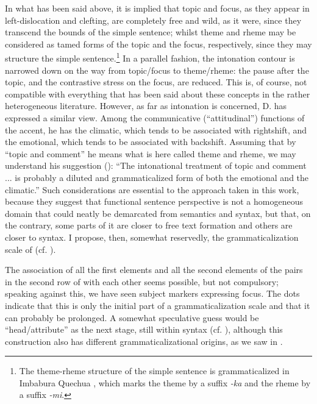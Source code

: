 In what has been said above, it is implied that topic and focus, as they appear in left-dislocation and clefting, are completely free and wild, as it were, since they transcend the bounds of the simple sentence; whilst theme and rheme may be considered as tamed forms of the topic and the focus, respectively, since they may structure the simple sentence.\footnote{The theme-rheme structure of the simple sentence is grammaticalized in Imbabura Quechua \citep[95-98]{Cole1982}, which marks the theme by a suffix \textit{{}-ka} and the rheme by a suffix \textit{{}-mi}.} In a parallel fashion, the intonation contour is narrowed down on the way from topic/focus to theme/rheme: the pause after the topic, and the contrastive stress on the focus, are reduced. This is, of course, not compatible with everything that has been said about these concepts in the rather heterogeneous literature. However, as far as intonation is concerned, D. \citet{Bolinger1978} has expressed a similar view. Among the communicative (“attitudinal”) functions of the accent, he has the climatic, which tends to be associated with rightshift, and the emotional, which tends to be associated with backshift. Assuming that by ``topic and comment'' he means what is here called theme and rheme, we may understand his suggestion (\citeyear[489]{Bolinger1978}): “The intonational treatment of topic and comment ... is probably a diluted and grammaticalized form of both the emotional and the climatic.” Such considerations are essential to the approach taken in this work, because they suggest that functional sentence perspective is not a homogeneous domain that could neatly be demarcated from semantics and syntax, but that, on the contrary, some parts of it are closer to free text formation and others are closer to syntax. I propose, then, somewhat reservedly, the grammaticalization scale of  (cf. ).

The association of all the first elements and all the second elements of the pairs in the second row of  with each other seems possible, but not compulsory; speaking against this, we have seen subject markers expressing focus. The dots indicate that this is only the initial part of a grammaticalization scale and that it can probably be prolonged. A somewhat speculative guess would be ``head/attribute'' as the next stage, still within syntax (cf. \citealt[Ch.~\textsc{iv}.2]{Lehmann1984}), although this construction also has different grammaticalizational origins, as we saw in .

